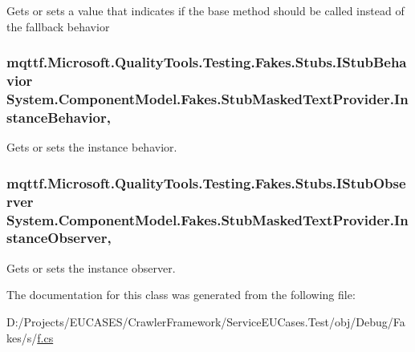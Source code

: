 Gets or sets a value that indicates if the base method should be called instead of the fallback behavior

\hypertarget{class_system_1_1_component_model_1_1_fakes_1_1_stub_masked_text_provider_a3f45b3f7894e1913e30a552d1ddeb959}{
\subsubsection[{Instance\-Behavior}]{\setlength{\rightskip}{0pt plus 5cm}mqttf.\-Microsoft.\-Quality\-Tools.\-Testing.\-Fakes.\-Stubs.\-I\-Stub\-Behavior System.\-Component\-Model.\-Fakes.\-Stub\-Masked\-Text\-Provider.\-Instance\-Behavior\hspace{0.3cm}{\ttfamily [get]}, {\ttfamily [set]}}}\label{class_system_1_1_component_model_1_1_fakes_1_1_stub_masked_text_provider_a3f45b3f7894e1913e30a552d1ddeb959}


Gets or sets the instance behavior.

\hypertarget{class_system_1_1_component_model_1_1_fakes_1_1_stub_masked_text_provider_a1abac6ad92dde6986836c6547de92f51}{
\subsubsection[{Instance\-Observer}]{\setlength{\rightskip}{0pt plus 5cm}mqttf.\-Microsoft.\-Quality\-Tools.\-Testing.\-Fakes.\-Stubs.\-I\-Stub\-Observer System.\-Component\-Model.\-Fakes.\-Stub\-Masked\-Text\-Provider.\-Instance\-Observer\hspace{0.3cm}{\ttfamily [get]}, {\ttfamily [set]}}}\label{class_system_1_1_component_model_1_1_fakes_1_1_stub_masked_text_provider_a1abac6ad92dde6986836c6547de92f51}


Gets or sets the instance observer.



The documentation for this class was generated from the following file\-:\begin{DoxyCompactItemize}
\item 
D\-:/\-Projects/\-E\-U\-C\-A\-S\-E\-S/\-Crawler\-Framework/\-Service\-E\-U\-Cases.\-Test/obj/\-Debug/\-Fakes/s/\hyperlink{s_2f_8cs}{f.\-cs}\end{DoxyCompactItemize}
